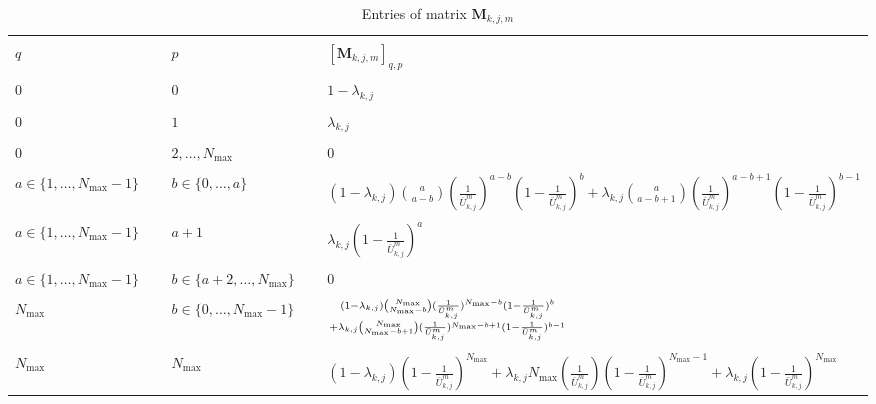 \begin{table*}
    \centering
    \caption{Entries of matrix $\mathbf{M}_{k,j,m}$}
    \label{table:M_{k,j,m}}
    \begin{tabular}{ |p{0.27\linewidth}|p{0.27\linewidth}|p{0.46\linewidth}| }  
        \hline
        & & \\[-6pt]
        $q$&$p$&$[\mathbf{M}_{k,j,m}]_{q,p}$ \\
        \hline
        & &  \\[-6pt]
        $0$&$0$&$1-\lambda_{k,j}$ \\
        \hline
        & &  \\[-6pt]
        $0$&$1$&$\lambda_{k,j}$ \\
        \hline
        & &  \\[-6pt] 
        $0$&$2,\dots,N_{\max}$&$0$ \\
        \hline
        & &  \\[-6pt] 
        $a\in\{1,\dots,N_{\max}-1\}$ & $b\in\{0,\dots,a\}$ & $(1-\lambda_{k,j})\binom{a}{a-b}(\frac{1}{\bar{U}_{k,j}^{m}})^{a-b}(1-\frac{1}{\bar{U}_{k,j}^{m}})^{b}+\lambda_{k,j}\binom{a}{a-b+1}(\frac{1}{\bar{U}_{k,j}^{m}})^{a-b+1}(1-\frac{1}{\bar{U}_{k,j}^{m}})^{b-1}$ \\
        \hline
        & &  \\[-6pt] 
        $a\in\{1,\dots,N_{\max}-1\}$&$a+1$&$\lambda_{k,j}(1-\frac{1}{\bar{U}_{k,j}^{m}})^{a}$ \\
        \hline
        & &  \\[-6pt] 
        $a\in\{1,\dots,N_{\max}-1\}$&$b\in\{a+2,\dots,N_{\max}\}$&$0$ \\
        \hline
        & &  \\[-6pt] 
        $N_{\max}$&$b\in\{0,\dots,N_{\max}-1\}$&${(1-\lambda_{k,j})\binom{N_{\max}}{N_{\max}-b}(\frac{1}{\bar{U}_{k,j}^{m}})^{N_{\max}-b}(1-\frac{1}{\bar{U}_{k,j}^{m}})^{b}\atop+\lambda_{k,j}\binom{N_{\max}}{N_{\max}-b+1}(\frac{1}{\bar{U}_{k,j}^{m}})^{N_{\max}-b+1}(1-\frac{1}{\bar{U}_{k,j}^{m}})^{b-1}}$ \\
        \hline
        & &  \\[-6pt] 
        $N_{\max}$ & $N_{\max}$ & $(1-\lambda_{k,j})(1-\frac{1}{\bar{U}_{k,j}^{m}})^{N_{\max}}+\lambda_{k,j}{N_{\max}}(\frac{1}{\bar{U}_{k,j}^{m}})(1-\frac{1}{\bar{U}_{k,j}^{m}})^{N_{\max}-1}+\lambda_{k,j}(1-\frac{1}{\bar{U}_{k,j}^{m}})^{N_{\max}}$ \\
        \hline
    \end{tabular}
\end{table*}

